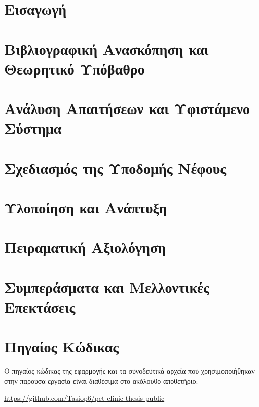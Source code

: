 \documentclass[12pt,a4paper,twoside,fleqn]{book}
\begin{document}
\mainmatter

\chapter{Εισαγωγή}



\chapter{Βιβλιογραφική Ανασκόπηση και Θεωρητικό Υπόβαθρο}


\chapter{Ανάλυση Απαιτήσεων και Υφιστάμενο Σύστημα}


\chapter{Σχεδιασμός της Υποδομής Νέφους}



\chapter{Υλοποίηση και Ανάπτυξη}



\chapter{Πειραματική Αξιολόγηση}



\chapter{Συμπεράσματα και Μελλοντικές Επεκτάσεις}


\cleardoublepage
\chapter*{Πηγαίος Κώδικας}
Ο πηγαίος κώδικας της εφαρμογής και τα συνοδευτικά αρχεία που χρησιμοποιήθηκαν
στην παρούσα εργασία είναι διαθέσιμα στο ακόλουθο αποθετήριο:

\begin{center}
\url{https://github.com/Tasiop6/pet-clinic-thesis-public}
\end{center}


\cleardoublepage
{}


\end{document}
